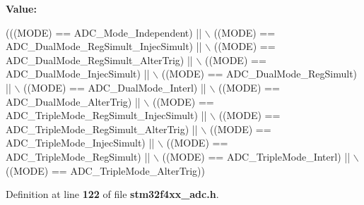 {\bfseries Value\+:}
\begin{DoxyCode}
(((MODE) == ADC_Mode_Independent) || \(\backslash\)
                           ((MODE) == ADC_DualMode_RegSimult_InjecSimult) || \(\backslash\)
                           ((MODE) == ADC_DualMode_RegSimult_AlterTrig) || \(\backslash\)
                           ((MODE) == ADC_DualMode_InjecSimult) || \(\backslash\)
                           ((MODE) == ADC_DualMode_RegSimult) || \(\backslash\)
                           ((MODE) == ADC_DualMode_Interl) || \(\backslash\)
                           ((MODE) == ADC_DualMode_AlterTrig) || \(\backslash\)
                           ((MODE) == ADC_TripleMode_RegSimult_InjecSimult) || \(\backslash\)
                           ((MODE) == ADC_TripleMode_RegSimult_AlterTrig) || \(\backslash\)
                           ((MODE) == ADC_TripleMode_InjecSimult) || \(\backslash\)
                           ((MODE) == ADC_TripleMode_RegSimult) || \(\backslash\)
                           ((MODE) == ADC_TripleMode_Interl) || \(\backslash\)
                           ((MODE) == ADC_TripleMode_AlterTrig))
\end{DoxyCode}


Definition at line \textbf{ 122} of file \textbf{ stm32f4xx\+\_\+adc.\+h}.

